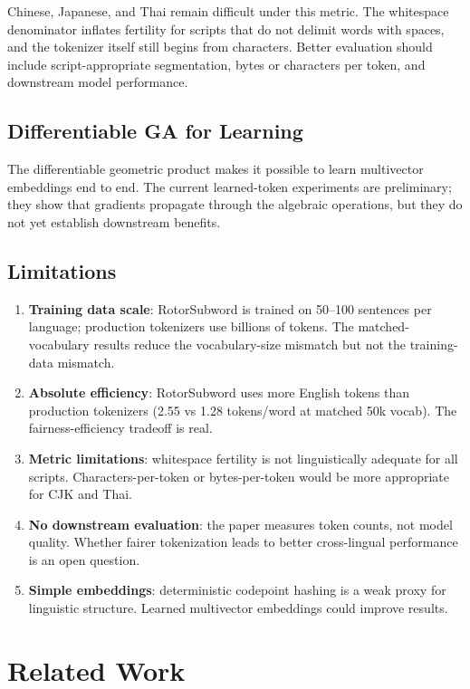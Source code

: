 \documentclass[11pt]{article}
\begin{document}
Chinese, Japanese, and Thai remain difficult under this metric. The whitespace denominator inflates fertility for scripts that do not delimit words with spaces, and the tokenizer itself still begins from characters. Better evaluation should include script-appropriate segmentation, bytes or characters per token, and downstream model performance.

\subsection{Differentiable GA for Learning}

The differentiable geometric product makes it possible to learn multivector embeddings end to end. The current learned-token experiments are preliminary; they show that gradients propagate through the algebraic operations, but they do not yet establish downstream benefits.

\subsection{Limitations}

\begin{enumerate}
  \item \textbf{Training data scale}: RotorSubword is trained on 50--100 sentences per language; production tokenizers use billions of tokens. The matched-vocabulary results reduce the vocabulary-size mismatch but not the training-data mismatch.
  \item \textbf{Absolute efficiency}: RotorSubword uses more English tokens than production tokenizers (2.55 vs 1.28 tokens/word at matched 50k vocab). The fairness-efficiency tradeoff is real.
  \item \textbf{Metric limitations}: whitespace fertility is not linguistically adequate for all scripts. Characters-per-token or bytes-per-token would be more appropriate for CJK and Thai.
  \item \textbf{No downstream evaluation}: the paper measures token counts, not model quality. Whether fairer tokenization leads to better cross-lingual performance is an open question.
  \item \textbf{Simple embeddings}: deterministic codepoint hashing is a weak proxy for linguistic structure. Learned multivector embeddings could improve results.
\end{enumerate}

\section{Related Work}
\end{document}
